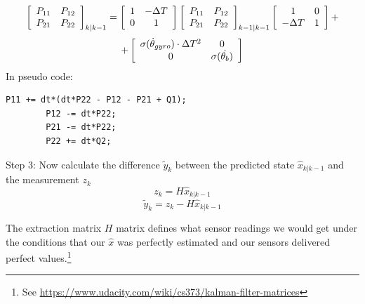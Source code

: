 \documentclass[a4paper]{report}
\begin{document}
		\begin{equation}
		\label{eq:error-covariance-prediction-detailed}
		\left[
		\begin{array}{c c}
		P_{11}	&	P_{12}\\
		P_{21}	&	P_{22}
		\end{array} \right]_{k|k-1}
		=
		\left[
		\begin{array}{c c}
		1 & - \Delta T\\
		0 & 1
		\end{array} \right]
		\left[
		\begin{array}{c c}
		P_{11}	&	P_{12}\\
		P_{21}	&	P_{22}
		\end{array} \right]_{k-1|k-1}
		\left[
		\begin{array}{c c}
		1	&	0\\
		- \Delta T & 1
		\end{array} \right]
		+
		\end{equation}
		\begin{equation}
		+
		\left[
		\begin{array}{c c}
		\sigma(\dot{\theta}_{gyro})\cdot\Delta T^{2}	&	0\\
		0	&	 \sigma(\dot{\theta_{b}})
		\end{array} \right]
		\end{equation}
    In pseudo code:
		\begin{lstlisting}[frame=single]
		P11 += dt*(dt*P22 - P12 - P21 + Q1);
		P12 -= dt*P22;
		P21 -= dt*P22;
		P22 += dt*Q2;
		\end{lstlisting}
		Step 3: Now calculate the difference $\tilde{y}_{k}$ between the predicted state $\hat{x}_{k|k-1}$ and the measurement $z_{k}$
		\begin{equation}
		z_{k}=H\hat{x}_{k|k-1}
		\end{equation}
		\begin{equation}
		\tilde{y}_{k}=z_{k}-H\hat{x}_{k|k-1}
		\end{equation}

		The extraction matrix $H$ matrix defines what sensor readings we would get under the conditions that our $\hat{x}$ was perfectly estimated and our sensors delivered perfect values.\footnote{See  \url{https://www.udacity.com/wiki/cs373/kalman-filter-matrices}}
\end{document}
